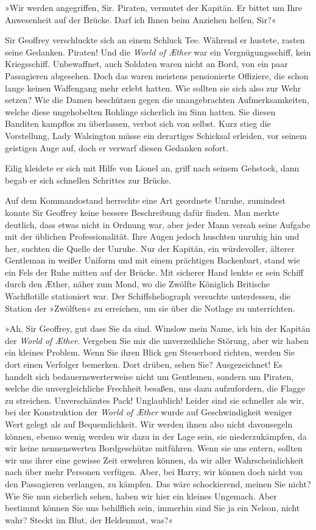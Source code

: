 »Wir werden angegriffen, Sir. Piraten, vermutet der Kapitän. Er
bittet um Ihre Anwesenheit auf der Brücke. Darf ich Ihnen beim
Anziehen helfen, Sir?«

Sir Geoffrey verschluckte sich an einem Schluck Tee. Während er
hustete, rasten seine Gedanken. Piraten! Und die \textit{World of Æther} war
ein Vergnügungsschiff, kein Kriegsschiff. Unbewaffnet, auch
Soldaten waren nicht an Bord, von ein paar Passagieren abgesehen.
Doch das waren meistens pensionierte Offiziere, die schon lange
keinen Waffengang mehr erlebt hatten. Wie sollten sie sich also zur
Wehr setzen? Wie die Damen beschützen gegen die unangebrachten
Aufmerksamkeiten, welche diese ungehobelten Rohlinge sicherlich im
Sinn hatten. Sie diesen Banditen kampflos zu überlassen, verbot
sich von selbst. Kurz stieg die Vorstellung, Lady Walsington müsse
ein derartiges Schicksal erleiden, vor seinem geistigen Auge auf,
doch er verwarf diesen Gedanken sofort.

Eilig kleidete er sich mit Hilfe von Lionel an, griff nach seinem
Gehstock, dann begab er sich schnellen Schrittes zur Brücke.

\bigpar

Auf dem Kommandostand herrschte eine Art geordnete Unruhe,
zumindest konnte Sir Geoffrey keine bessere Beschreibung dafür
finden. Man merkte deutlich, dass etwas nicht in Ordnung war, aber
jeder Mann versah seine Aufgabe mit der üblichen Professionalität.
Ihre Augen jedoch huschten unruhig hin und her, suchten die Quelle
der Unruhe. Nur der Kapitän, ein würdevoller, älterer Gentleman in
weißer Uniform und mit einem prächtigen Backenbart, stand wie ein
Fels der Ruhe mitten auf der Brücke. Mit sicherer Hand lenkte er
sein Schiff durch den Æther, näher zum Mond, wo die Zwölfte
Königlich Britische Wachflotille stationiert war. Der
Schiffsheliograph versuchte unterdessen, die Station der »Zwölften«
zu erreichen, um sie über die Notlage zu unterrichten.

»Ah, Sir Geoffrey, gut dass Sie da sind. Winslow mein Name, ich bin
der Kapitän der \textit{World of Æther}. Vergeben Sie mir die unverzeihliche
Störung, aber wir haben ein kleines Problem. Wenn Sie ihren Blick
gen Steuerbord richten, werden Sie dort einen Verfolger bemerken.
Dort drüben, sehen Sie? Ausgezeichnet! Es handelt sich
bedauernswerterweise nicht um Gentlemen, sondern um Piraten, welche
die unvergleichliche Frechheit besaßen, uns dazu aufzufordern, die
Flagge zu streichen. Unverschämtes Pack! Unglaublich! Leider sind
sie schneller als wir, bei der Konstruktion der \textit{World of Æther}
wurde auf Geschwindigkeit weniger Wert gelegt als auf
Bequemlichkeit. Wir werden ihnen also nicht davonsegeln können,
ebenso wenig werden wir dazu in der Lage sein, sie niederzukämpfen,
da wir keine nennenswerten Bordgeschütze mitführen. Wenn sie uns
entern, sollten wir uns ihrer eine gewisse Zeit erwehren können, da
wir aller Wahrscheinlichkeit nach über mehr Personen verfügen.
Aber, bei Harry, wir können doch nicht von den Passagieren
verlangen, zu kämpfen. Das wäre schockierend, meinen Sie nicht? Wie
Sie nun sicherlich sehen, haben wir hier ein kleines Ungemach. Aber
bestimmt können Sie uns behilflich sein, immerhin sind Sie ja ein
Nelson, nicht wahr? Steckt im Blut, der Heldenmut, was?«

